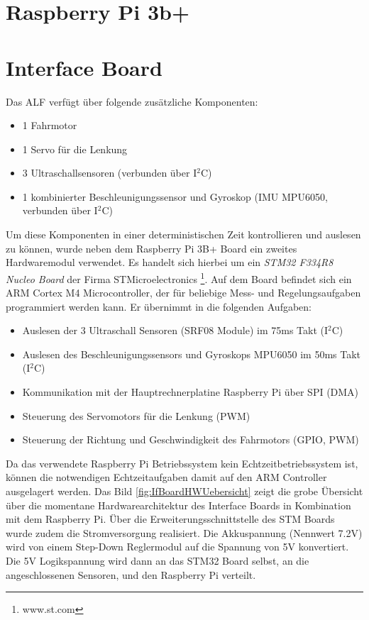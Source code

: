 \section{Raspberry Pi 3b+}


\newpage
\section{Interface Board}
\label{sec:InterfaceBoard}
Das ALF verfügt über folgende zusätzliche Komponenten:
\begin{itemize}
\item 1 Fahrmotor
\item 1 Servo für die Lenkung
\item 3 Ultraschallsensoren (verbunden über I$^{2}$C)
\item 1 kombinierter Beschleunigungssensor und Gyroskop (IMU MPU6050, verbunden über I$^{2}$C)
\end{itemize}

Um diese Komponenten in einer deterministischen Zeit kontrollieren und auslesen zu können, wurde neben dem Raspberry Pi 3B+ Board ein zweites Hardwaremodul verwendet. Es handelt sich hierbei um ein \textit{STM32 F334R8 Nucleo Board} der Firma STMicroelectronics \footnote{www.st.com}. Auf dem Board befindet sich ein ARM Cortex M4 Microcontroller, der für beliebige Mess- und Regelungsaufgaben programmiert werden kann. Er übernimmt in die folgenden Aufgaben:
\begin{itemize}
\item Auslesen der 3 Ultraschall Sensoren (SRF08 Module) im 75ms Takt (I$^{2}$C)
\item Auslesen des Beschleunigungssensors und Gyroskops MPU6050 im 50ms Takt (I$^{2}$C)
\item Kommunikation mit der Hauptrechnerplatine Raspberry Pi über SPI (DMA)
\item Steuerung des Servomotors für die Lenkung (PWM)
\item Steuerung der Richtung und Geschwindigkeit des Fahrmotors (GPIO, PWM)
\end{itemize}
Da das verwendete Raspberry Pi Betriebssystem kein Echtzeitbetriebssystem ist, können die notwendigen Echtzeitaufgaben damit auf den ARM Controller ausgelagert werden. Das Bild \ref{fig:IfBoardHWUebersicht} zeigt die grobe Übersicht über die momentane Hardwarearchitektur des Interface Boards in Kombination mit dem Raspberry Pi. Über die Erweiterungsschnittstelle des STM Boards wurde zudem die Stromversorgung realisiert. Die Akkuspannung (Nennwert 7.2V) wird von einem Step-Down Reglermodul auf die Spannung von 5V konvertiert. Die 5V Logikspannung wird dann an das STM32 Board selbst, an die angeschlossenen Sensoren, und den Raspberry Pi verteilt.

